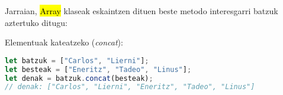 % 
% 
% 
% 
% 
% 
% 

Jarraian, \hl{Array} klaseak eskaintzen dituen beste metodo interesgarri batzuk aztertuko ditugu:



\vspace{5mm} %
 Elementuak kateatzeko (\textit{concat}):

\begin{minipage}{\linewidth}
\begin{lstlisting}[language=JavaScript]
let batzuk = ["Carlos", "Lierni"];
let besteak = ["Eneritz", "Tadeo", "Linus"];
let denak = batzuk.concat(besteak);
// denak: ["Carlos", "Lierni", "Eneritz", "Tadeo", "Linus"]
\end{lstlisting}
\end{minipage}

